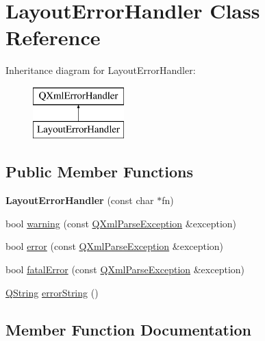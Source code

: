 \hypertarget{class_layout_error_handler}{}\section{Layout\+Error\+Handler Class Reference}
\label{class_layout_error_handler}
Inheritance diagram for Layout\+Error\+Handler\+:\begin{figure}[H]
\begin{center}
\leavevmode
\includegraphics[height=2.000000cm]{class_layout_error_handler}
\end{center}
\end{figure}
\subsection*{Public Member Functions}
\begin{DoxyCompactItemize}
\item 
\mbox{\label{class_layout_error_handler_ab8c68291771ab718868961ed340cb97b}} 
{\bfseries Layout\+Error\+Handler} (const char $\ast$fn)
\item 
bool \mbox{\hyperlink{class_layout_error_handler_a463dfca8796fee3c40a08817d1af64be}{warning}} (const \mbox{\hyperlink{class_q_xml_parse_exception}{Q\+Xml\+Parse\+Exception}} \&exception)
\item 
bool \mbox{\hyperlink{class_layout_error_handler_a7981be5cbf89e7f5bf27b3d75a821726}{error}} (const \mbox{\hyperlink{class_q_xml_parse_exception}{Q\+Xml\+Parse\+Exception}} \&exception)
\item 
bool \mbox{\hyperlink{class_layout_error_handler_aca31cecb0d737ede70e22c86d038bbb4}{fatal\+Error}} (const \mbox{\hyperlink{class_q_xml_parse_exception}{Q\+Xml\+Parse\+Exception}} \&exception)
\item 
\mbox{\hyperlink{class_q_string}{Q\+String}} \mbox{\hyperlink{class_layout_error_handler_a042664a153147e99f4ee0cb3bdf76418}{error\+String}} ()
\end{DoxyCompactItemize}


\subsection{Member Function Documentation}
\mbox{\label{class_layout_error_handler_a7981be5cbf89e7f5bf27b3d75a821726}} 
